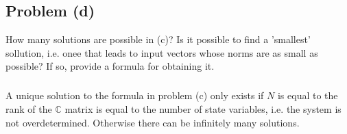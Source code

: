 \documentclass[11pt]{article}
\begin{document}
\subsection*{Problem (d)}
How many solutions are possible in (c)? Is it possible to find a 'smallest' sollution, i.e. onee that leads to input vectors whose norms are as small as possible? If so, provide a formula for obtaining it.

\subparagraph*{}
A unique solution to the formula in problem (c) only exists if $N$ is equal to the rank of the $\mathbb{C}$ matrix is equal to the number of state variables, i.e. the system is not overdetermined. Otherwise there can be infinitely many solutions.
\end{document}
